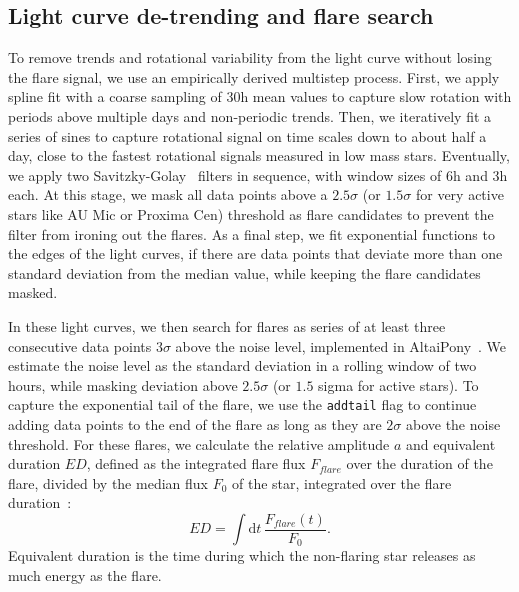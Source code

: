 \documentclass[twocolumn]{aastex631}
\begin{document}
\subsection{Light curve de-trending and flare search}
\label{sec:methods:flaresearch}
To remove trends and rotational variability from the light curve without losing the flare signal, we use an empirically derived multistep process. First, we apply spline fit with a coarse sampling of 30h mean values to capture slow rotation with periods above multiple days and non-periodic trends. Then, we iteratively fit a series of sines to capture rotational signal on time scales down to about half a day, close to the fastest rotational signals measured in low mass stars. Eventually, we apply two Savitzky-Golay~\cite{savitzky1964smoothing} filters in sequence, with window sizes of 6h and 3h each. At this stage, we mask all data points above a $2.5 \sigma$ (or $1.5 \sigma$ for very active stars like AU Mic or Proxima Cen) threshold as flare candidates to prevent the filter from ironing out the flares. As a final step, we fit exponential functions to the edges of the light curves, if there are data points that deviate more than one standard deviation from the median value, while keeping the flare candidates masked.

In these light curves, we then search for flares as series of at least three consecutive data points $3\sigma$ above the noise level, implemented in AltaiPony~\cite{ilin2021altaipony}. We estimate the noise
level as the standard deviation in a rolling window of two hours, while masking deviation above $2.5\sigma$ (or $1.5$ sigma for active stars). To capture the exponential tail of the flare, we use the \texttt{addtail} flag to continue adding data points to the end of the flare as long as they are $2\sigma$ above the noise threshold. For these flares, we calculate the relative amplitude $a$ and equivalent duration $ED$, defined as the integrated flare flux $F_{flare}$ over the duration of the flare, divided by the median flux $F_0$ of the star, integrated over the flare duration~\citep{gershberg1972results}:
\begin{equation}
\label{eq:ED}
ED=\displaystyle \int \mathrm dt\, \frac{F_{flare}(t)}{F_0}.
\end{equation}
Equivalent duration is the time during which the non-flaring star releases as much energy as the flare.
\end{document}
